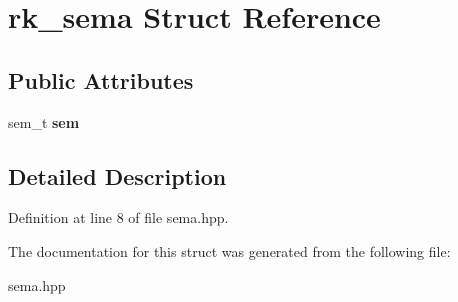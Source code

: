 \hypertarget{structrk__sema}{}\section{rk\+\_\+sema Struct Reference}
\label{structrk__sema}
\subsection*{Public Attributes}
\begin{DoxyCompactItemize}
\item 
\mbox{\label{structrk__sema_aa1a0c0c37646f85eb88bca7c48e7c5a3}} 
sem\+\_\+t {\bfseries sem}
\end{DoxyCompactItemize}


\subsection{Detailed Description}


Definition at line 8 of file sema.\+hpp.



The documentation for this struct was generated from the following file\+:\begin{DoxyCompactItemize}
\item 
sema.\+hpp\end{DoxyCompactItemize}
